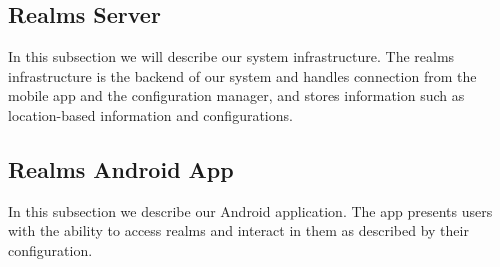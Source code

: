 \subsection{Realms Server} %
\label{sub:realms_infrastructure}
In this subsection we will describe our system infrastructure. The realms infrastructure is the backend of our system and handles connection from the mobile app and the configuration manager, and stores information such as location-based information and configurations.

\subsection{Realms Android App} %
\label{sub:realms_android_app}
In this subsection we describe our Android application. The app presents users with the ability to access realms and interact in them as described by their configuration.
